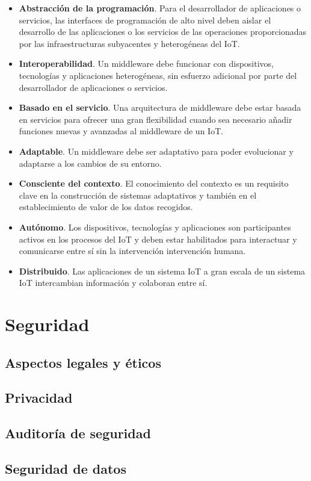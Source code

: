 {\begin{itemize}
    \item \textbf{Abstracción de la programación}. Para el desarrollador de aplicaciones o servicios, las interfaces de programación de alto nivel deben aislar el desarrollo de las aplicaciones o los servicios de las operaciones proporcionadas por las infraestructuras subyacentes y heterogéneas del IoT. 
    \item \textbf{Interoperabilidad}. Un middleware debe funcionar con dispositivos, tecnologías y aplicaciones heterogéneas, sin esfuerzo adicional por parte del desarrollador de aplicaciones o servicios.
    \item \textbf{Basado en el servicio}. Una arquitectura de middleware debe estar basada en servicios para ofrecer una gran flexibilidad cuando sea necesario añadir funciones nuevas y avanzadas al middleware de un IoT.
    \item \textbf{Adaptable}. Un middleware debe ser adaptativo para poder evolucionar y adaptarse a los cambios de su entorno.
    \item \textbf{Consciente del contexto}. El conocimiento del contexto es un requisito clave en la construcción de sistemas adaptativos y también en el establecimiento de valor de los datos recogidos.
    \item \textbf{Autónomo}. Los dispositivos, tecnologías y aplicaciones son participantes activos en los procesos del IoT y deben estar habilitados para interactuar y comunicarse entre sí sin la intervención intervención humana.
    \item \textbf{Distribuido}.  Las aplicaciones de un sistema IoT a gran escala de un sistema IoT intercambian información y colaboran entre sí.
\end{itemize}

\section{Seguridad}

\subsection{Aspectos legales y éticos}


\subsection{Privacidad}


\subsection{Auditoría de seguridad}


\subsection{Seguridad de datos}

}